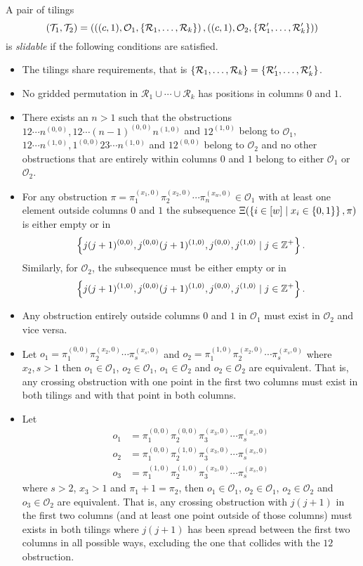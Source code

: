 \begin{definition}\label{def:slidable}
A pair of tilings
\[
    (\mathcal{T}_1,\mathcal{T}_2) = \left(\left((c,1), \mathcal{O}_1, \left\{\mathcal{R}_1,\ldots,\mathcal{R}_k\right\}\right), \left((c,1), \mathcal{O}_2, \left\{\mathcal{R}'_1,\ldots,\mathcal{R}'_k\right\}\right)\right)
\]
is \emph{slidable} if the following conditions are satisfied.
\begin{itemize}
    \item The tilings share requirements, that is $\left\{\mathcal{R}_1,\ldots,\mathcal{R}_k\right\}=\left\{\mathcal{R}'_1,\ldots,\mathcal{R}'_k\right\}$.
    \item No gridded permutation in $\mathcal{R}_1 \cup \cdots \cup \mathcal{R}_k$ has positions in columns $0$ and $1$.
    \item There exists an $n>1$ such that the obstructions $12\cdots n^{(0,0)}, 12\cdots (n-1)^{(0,0)}n^{(1,0)}$ and $12^{(1,0)}$ belong to $\mathcal{O}_1$, $12\cdots n^{(1,0)}, 1^{(0,0)}23\cdots n^{(1,0)}$ and $12^{(0,0)}$ belong to $\mathcal{O}_2$ and no other obstructions that are entirely within columns $0$ and $1$ belong to either $\mathcal{O}_1$ or $\mathcal{O}_2$.
    \item For any obstruction $\pi = \pi_1^{(x_1,0)}\pi_2^{(x_2,0)}\cdots\pi_n^{(x_w,0)} \in \mathcal{O}_1$ with at least one element outside columns $0$ and $1$ the subsequence $\Xi(\left\{i \in [w] \mid x_i \in \left\{0,1\right\}\right\},\pi)$ is either empty or in 
    \[
         \left\{j(j+1)^{(0,0)}, j^{(0,0)}(j+1)^{(1,0)}, j^{(0,0)},j^{(1,0)} \mid j\in\mathbb{Z}^+\right\}.
    \]
    Similarly, for $\mathcal{O}_2$, the subsequence must be either empty or in 
    \[
         \left\{j(j+1)^{(1,0)}, j^{(0,0)}(j+1)^{(1,0)}, j^{(0,0)},j^{(1,0)} \mid j\in\mathbb{Z}^+\right\}.
    \]
    \item Any obstruction entirely outside columns $0$ and $1$ in $\mathcal{O}_1$ must exist in $\mathcal{O}_2$ and vice versa.
    \item Let $o_1 = \pi_1^{(0,0)}\pi_2^{(x_2,0)}\cdots\pi_s^{(x_s,0)}$ and $o_2 = \pi_1^{(1,0)}\pi_2^{(x_2,0)}\cdots\pi_s^{(x_s,0)}$ where $x_2,s > 1$ then $o_1 \in \mathcal{O}_1$, $o_2 \in \mathcal{O}_1$, $o_1 \in \mathcal{O}_2$ and $o_2 \in \mathcal{O}_2$ are equivalent. That is, any crossing obstruction with one point in the first two columns must exist in both tilings and with that point in both columns.
    \item Let \begin{align*}o_1 &= \pi_1^{(0,0)}\pi_2^{(0,0)}\pi_3^{(x_3,0)}\cdots\pi_s^{(x_s,0)}\\o_2 &= \pi_1^{(0,0)}\pi_2^{(1,0)}\pi_3^{(x_3,0)}\cdots\pi_s^{(x_s,0)}\\o_3 &= \pi_1^{(1,0)}\pi_2^{(1,0)}\pi_3^{(x_3,0)}\cdots\pi_s^{(x_s,0)}\end{align*} where $s > 2$, $x_3 > 1$ and $\pi_1 + 1 = \pi_2$, then $o_1 \in \mathcal{O}_1$, $o_2 \in \mathcal{O}_1$, $o_2 \in \mathcal{O}_2$ and $o_3 \in \mathcal{O}_2$ are equivalent. That is, any crossing obstruction with $j(j+1)$ in the first two columns (and at least one point outside of those columns) must exists in both tilings where $j(j+1)$ has been spread between the first two columns in all possible ways, excluding the one that collides with the $12$ obstruction.

\end{itemize}
\end{definition}
